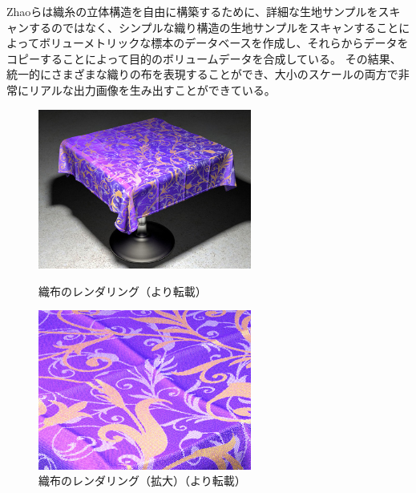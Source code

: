 Zhaoら\cite{zhao2012structure}は織糸の立体構造を自由に構築するために、詳細な生地サンプルをスキャンするのではなく、シンプルな織り構造の生地サンプルをスキャンすることによってボリューメトリックな標本のデータベースを作成し、それらからデータをコピーすることによって目的のボリュームデータを合成している。
その結果、統一的にさまざまな織りの布を表現することができ、大小のスケールの両方で非常にリアルな出力画像を生み出すことができている。


\begin{figure}[htbp]
 \begin{minipage}{0.4\hsize}
  \begin{center}
   \includegraphics[width=70mm]{./img/mft_purple_cloth_ld.jpg}
  \end{center}
  \caption{織布のレンダリング（\cite{zhao2013modular}より転載）}
  \label{FZhao1}
 \end{minipage}
 \begin{minipage}{0.75\hsize}
  \begin{center}
    \includegraphics[width=70mm]{./img/mft_zoom_ld.jpg}
  \end{center}
  \caption{織布のレンダリング（拡大）（\cite{zhao2013modular}より転載）}
  \label{FZhao2}
 \end{minipage}
\end{figure}

